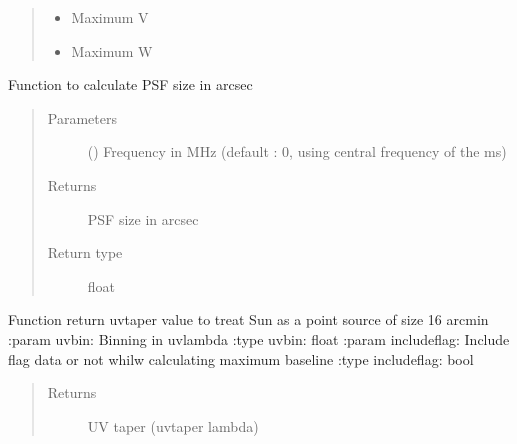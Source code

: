 \documentclass[letterpaper,10pt,english]{sphinxmanual}
\begin{document}
\begin{fulllineitems}
\begin{fulllineitems}
\begin{quote}
\begin{description}
\begin{itemize}
\item {} 
\sphinxAtStartPar
{} \textendash{} Maximum V

\item {} 
\sphinxAtStartPar
{} \textendash{} Maximum W

\end{itemize}


\end{description}\end{quote}

\end{fulllineitems}


\begin{fulllineitems}
\label{\detokenize{paircars:paircars.basic_func.ImageBasic.calc_psf}}
\sphinxAtStartPar
Function to calculate PSF size in arcsec
\begin{quote}\begin{description}
\item[{Parameters}] \leavevmode
\sphinxAtStartPar
{} () \textendash{} Frequency in MHz (default : 0, using central frequency of the ms)

\item[{Returns}] \leavevmode
\sphinxAtStartPar
PSF size in arcsec

\item[{Return type}] \leavevmode
\sphinxAtStartPar
float

\end{description}\end{quote}

\end{fulllineitems}


\begin{fulllineitems}
\label{\detokenize{paircars:paircars.basic_func.ImageBasic.calc_suntaper}}
\sphinxAtStartPar
Function return uv\sphinxhyphen{}taper value to treat Sun as a point source of size 16 arcmin
:param uvbin: Binning in uv\sphinxhyphen{}lambda
:type uvbin: float
:param includeflag: Include flag data or not whilw calculating maximum baseline
:type includeflag: bool
\begin{quote}\begin{description}
\item[{Returns}] \leavevmode
\sphinxAtStartPar
UV taper (uvtaper lambda)


\end{description}
\end{quote}
\end{fulllineitems}
\end{fulllineitems}
\end{document}
